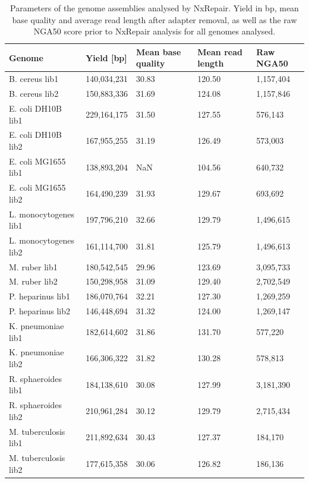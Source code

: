 \begin{table}[]
\begin{center}
{
\caption{Parameters of the genome assemblies analysed by NxRepair. Yield in bp, mean base quality and average read length after adapter removal, as well as the raw NGA50 score prior to NxRepair analysis for all genomes analysed.\label{tab:yield}}
{\begin{tabular}{lllll}\hline
Genome & Yield [bp] & Mean base quality & Mean read length & Raw NGA50 \\\hline
B. cereus lib1 & 140,034,231 & 30.83 & 120.50 &  1,157,404\\
B. cereus lib2 & 150,883,336 & 31.69 & 124.08  & 1,157,846\\
E. coli DH10B lib1 & 229,164,175 & 31.50 & 127.55 & 576,143\\
E. coli DH10B lib2 & 167,955,255 & 31.19 & 126.49 & 573,003\\
E. coli MG1655 lib1 & 138,893,204 & NaN & 104.56 & 640,732\\
E. coli MG1655 lib2 & 164,490,239 & 31.93 & 129.67 & 693,692\\
L. monocytogenes lib1 & 197,796,210 & 32.66 & 129.79 & 1,496,615\\
L. monocytogenes lib2 & 161,114,700 & 31.81 & 125.79 & 1,496,613\\
M. ruber lib1 & 180,542,545 & 29.96 & 123.69 & 3,095,733\\
M. ruber lib2 & 150,298,958 & 31.09 & 129.40 & 2,702,549\\
P. heparinus lib1 & 186,070,764 & 32.21 & 127.30 & 1,269,259\\
P. heparinus lib2 & 146,448,694 & 31.32 & 124.00 & 1,269,147\\
K. pneumoniae lib1 & 182,614,602 & 31.86 & 131.70 & 577,220\\
K. pneumoniae lib2 & 166,306,322 & 31.82 & 130.28 & 578,813\\
R. sphaeroides lib1 & 184,138,610 & 30.08 & 127.99 & 3,181,390\\
R. sphaeroides lib2 & 210,961,284 & 30.12 & 129.79 & 2,715,434\\
M. tuberculosis lib1 & 211,892,634 & 30.43 & 127.37 & 184,170\\
M. tuberculosis lib2 & 177,615,358 & 30.06 & 126.82 & 186,136\\\hline
\end{tabular}}{}
}
\end{center}
\end{table}  


